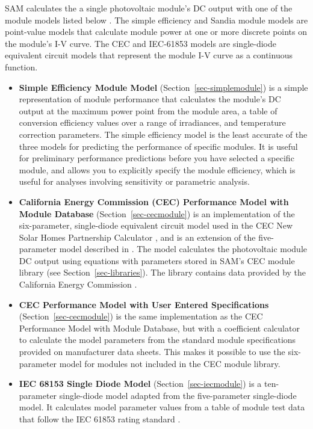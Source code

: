 \documentclass[12pt,letterpaper]{article}
\begin{document}
SAM calculates the a single photovoltaic module's DC output with one of the module models listed below \citep{blair2013}. The simple efficiency and Sandia module models are point-value models that calculate module power at one or more discrete points on the module's I-V curve. The CEC and IEC-61853 models are single-diode equivalent circuit models that represent the module I-V curve as a continuous function.

\begin{itemize}
\item \textbf{Simple Efficiency Module Model} (Section~\ref{sec-simplemodule}) is a simple representation of module performance that calculates the module's DC output at the maximum power point from the module area, a table of conversion efficiency values over a range of irradiances, and temperature correction parameters. The simple efficiency model is the least accurate of the three models for predicting the performance of specific modules. It is useful for preliminary performance predictions before you have selected a specific module, and allows you to explicitly specify the module efficiency, which is useful for analyses involving sensitivity or parametric analysis.
\item \textbf{California Energy Commission (CEC) Performance Model with Module Database} (Section~\ref{sec-cecmodule}) is an implementation of the six-parameter, single-diode equivalent circuit model used in the CEC New Solar Homes Partnership Calculator \citep{gsc2014a}, and is an extension of the five-parameter model described in \citet{desoto2004a}. The model calculates the photovoltaic module DC output using equations with parameters stored in SAM's CEC module library (see Section~\ref{sec-libraries}). The library contains data provided by the California Energy Commission \citep{gsc2014a} \citep{gsc2014b}.
\item \textbf{CEC Performance Model with User Entered Specifications}  (Section~\ref{sec-cecmodule}) is the same implementation as the CEC Performance Model with Module Database, but with a coefficient calculator \citep{dobos2012a} to calculate the model parameters from the standard module specifications provided on manufacturer data sheets. This makes it possible to use the six-parameter model for modules not included in the CEC module library.
\item \textbf{IEC 68153 Single Diode Model} (Section~\ref{sec-iecmodule}) is a ten-parameter single-diode model adapted from the five-parameter single-diode model. It calculates model parameter values from a table of module test data that follow the IEC 61853 rating standard \citep{dobos2014}. 

\end{itemize}
\end{document}
